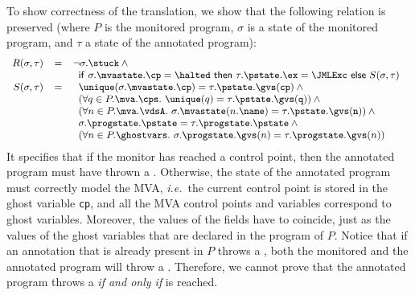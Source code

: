 To show correctness of the translation, we show that the following
relation is preserved (where \(P\) is the monitored program,
\(\sigma\) is a state of the monitored program, and \(\tau\) a state
of the annotated program):
\[{\small
\begin{array}{rcl}
R(\sigma, \tau) & = & \neg \sigma.\stuck \:\wedge\\
& & \begin{array}[t]{l}
\mathsf{if\ }\sigma.\mvastate.\cp = \halted
\mathsf{\ then\ }\tau.\pstate.\ex = \JMLExc
\mathsf{\ else\ }S(\sigma, \tau)
\end{array}\\
S(\sigma, \tau) & = &
\begin{array}[t]{l}
\unique(\sigma.\mvastate.\cp) = \tau.\pstate.\gvs(\texttt{cp}) \:\wedge\\
(\forall q \in P.\mva.\cps.\ \unique(q) =
\tau.\pstate.\gvs(\texttt{q})) \:\wedge\\
(\forall n \in P.\mva.\vdsA.\ \sigma.\mvastate(n.\name) =
                             \tau.\pstate.\gvs(\texttt{n})) \:\wedge\\
\sigma.\progstate.\pstate = \tau.\progstate.\pstate \:\wedge\\
(\forall n \in P.\ghostvars.\ \sigma.\progstate.\gvs(n) =
\tau.\progstate.\gvs(n))
\end{array}
\end{array}}
\]
It specifies that if the monitor has reached a \halted
control point, then the annotated program must have thrown a
\JMLExc. Otherwise, the state of the annotated program must correctly
model the MVA, \emph{i.e.}\ the current control point is stored in the
ghost variable \texttt{cp}, and all the MVA control points and
variables correspond to ghost variables. Moreover, the values of the
fields have to coincide, just as the values of the ghost variables
that are declared in the program of \(P\). Notice that if an
annotation that is already present in \(P\) throws a \JMLExc,
both the monitored and the annotated program will throw a \JMLExc.
Therefore, we cannot prove that the annotated program throws
a \JMLExc \emph{if and only if} \halted is reached.

